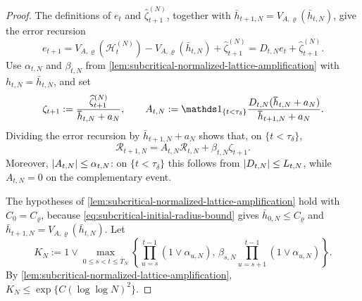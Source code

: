 \documentclass[11pt,reqno,a4paper]{article}
\begin{document}
\begin{proof}
  The definitions of $e_t$ and $\widehat\zeta_{t+1}^{(N)}$, together with
  $\bar h_{t+1,N}=V_{A,\varrho}(\bar h_{t,N})$, give the error recursion
  \begin{equation*}
    e_{t+1}
    =V_{A,\varrho}(\mathscr H_t^{(N)})
    -V_{A,\varrho}(\bar h_{t,N})+\widehat\zeta_{t+1}^{(N)}
    =D_{t,N}e_t+\widehat\zeta_{t+1}^{(N)}.
  \end{equation*}
  Use $\alpha_{t,N}$ and $\beta_{t,N}$ from
  \cref{lem:subcritical-normalized-lattice-amplification} with
  $h_{t,N}=\bar h_{t,N}$, and set
  \begin{equation*}
    \zeta_{t+1} :=
    \frac{\widehat\zeta_{t+1}^{(N)}}{\bar h_{t,N}+a_N},
    \qquad
    A_{t,N}:=
    \one_{\{t<\tau_\delta\}}
    \frac{D_{t,N}(\bar h_{t,N}+a_N)}
    {\bar h_{t+1,N}+a_N}.
  \end{equation*}
  Dividing the error recursion by $\bar h_{t+1,N}+a_N$ shows that, on
  $\{t<\tau_\delta\}$,
  \begin{equation}\label{eq:subcritical-normalized-error-recursion}
    \mathcal R_{t+1,N}
    =
    A_{t,N}\mathcal R_{t,N}+\beta_{t,N}\zeta_{t+1}.
  \end{equation}
  Moreover, $\abs{A_{t,N}}\leq\alpha_{t,N}$: on
  $\{t<\tau_\delta\}$ this follows from $\abs{D_{t,N}}\leq L_{t,N}$, while
  $A_{t,N}=0$ on the complementary event.

  The hypotheses of
  \cref{lem:subcritical-normalized-lattice-amplification} hold with
  $C_0=C_\varrho$, because
  \cref{eq:subcritical-initial-radius-bound} gives
  $\bar h_{0,N}\leq C_\varrho$ and
  $\bar h_{t+1,N}=V_{A,\varrho}(\bar h_{t,N})$. Let
  \begin{equation*}
    K_N
    :=
    1\vee
    \max_{0\leq s<t\leq\bar T_N}
    \left\{
      \prod_{u=s}^{t-1}(1\vee\alpha_{u,N}),\,
      \beta_{s,N}
      \prod_{u=s+1}^{t-1}(1\vee\alpha_{u,N})
    \right\}.
  \end{equation*}
  By \cref{lem:subcritical-normalized-lattice-amplification},
  $K_N\leq\exp\{C(\log\log N)^2\}$.


\end{proof}
\end{document}
